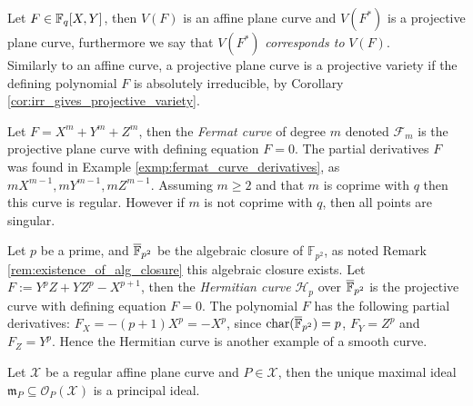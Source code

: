 Let $F \in \mathbb{F}_q[X, Y]$, then $V(F)$ is an affine plane curve and $V(F^{*})$ is a projective plane curve, furthermore we say that $V(F^{*})$ \textit{corresponds to} $V(F)$. \\ Similarly to an affine curve, a projective plane curve is a projective variety if the defining polynomial $F$ is absolutely irreducible, by Corollary \ref{cor:irr_gives_projective_variety}. \\

\begin{example}\label{exmp:fermat_curve_derivatives}
  Let $F = X^m + Y^m + Z^{m}$, then the \textit{Fermat curve} of degree $m$ denoted $\mathcal{F}_m$ is the projective plane curve with defining equation $F = 0$. The partial derivatives $F$ was found in Example \ref{exmp:fermat_curve_derivatives}, as $mX^{m - 1}, mY^{m - 1}, mZ^{m - 1}$. Assuming $m \geq 2$ and that $m$ is coprime with $q$ then this curve is regular. However if $m$ is not coprime with $q$, then all points are singular.
\end{example}

\begin{example}\label{exmp:hermetian_curve}
   Let $p$ be a prime, and $\overline{\mathbb{F}}_{p^{2}}$ be the algebraic closure of $\mathbb{F}_{p^{2}}$, as noted Remark \ref{rem:existence_of_alg_closure} this algebraic closure exists. Let $F :=Y^{p}Z + YZ^{p} - X^{p + 1}$, then the \textit{Hermitian curve} $\mathcal{H}_{p}$ over $\overline{\mathbb{F}}_{p^{2}}$ is the projective curve with defining equation $F = 0$. The polynomial $F$ has the following partial derivatives: $F_{X} = -(p + 1)X^{p} = -X^{p}$, since $\textnormal{char}({\overline{\mathbb{F}}_{p^{2}}}) = p$, $F_{Y} = Z^{p}$ and $F_{Z} = Y^{p}$. Hence the Hermitian curve is another example of a smooth curve.
\end{example}

\begin{lemma}\label{lem:maximal_ideal_of_plane_curves_are_prinicpal}
  Let $\mathcal{X}$ be a regular affine plane curve and $P \in \mathcal{X}$, then the unique maximal ideal $\mathfrak{m}_{P} \subseteq \mathcal{O}_{P}(\mathcal{X})$ is a principal ideal.
\end{lemma}

